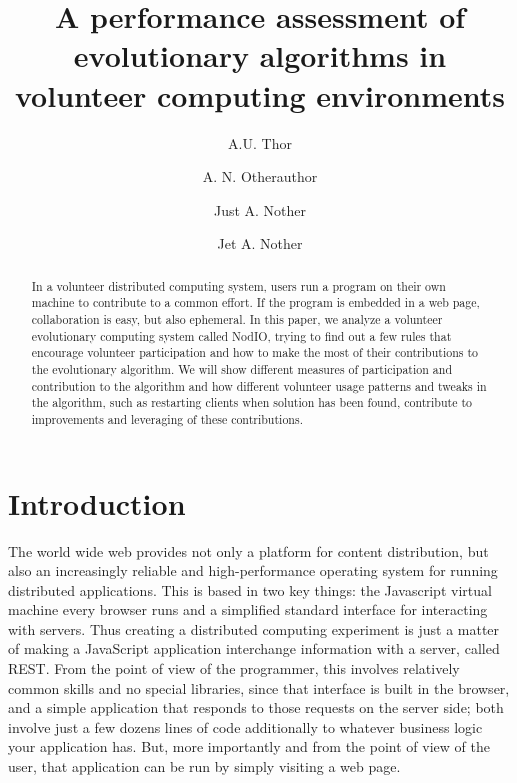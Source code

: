 \documentclass[runningheads,a4paper]{llncs}\usepackage[]{graphicx}\usepackage[]{color}
\begin{document}



\title{A performance assessment of evolutionary algorithms in
  volunteer computing environments} 



\author{A.U. Thor \and A. N. Otherauthor \and Just A. Nother 
  \and Jet A. Nother }


\maketitle


\begin{abstract}
In a volunteer distributed computing system, users run a program on
their own machine to contribute to a common effort. If the program is
embedded in a web page, collaboration is easy, but also ephemeral. In
this paper, we analyze a volunteer evolutionary computing system called
NodIO, trying to find out a few rules that encourage volunteer
participation and how to make the most of their contributions to the
evolutionary algorithm. We will show different measures of
participation and contribution to the algorithm and how different
volunteer usage patterns and tweaks in the algorithm, such as restarting clients when solution has been found, contribute to
improvements and leveraging of these contributions. 
\end{abstract}

\section{Introduction}
\label{introduction}


The world wide web provides not only a platform for content
distribution, but also an increasingly reliable and high-performance
operating system for running distributed applications. This is based
in two key things: the Javascript virtual machine every browser runs
and a simplified standard interface for interacting with servers.
Thus creating a distributed computing experiment is just a matter of
making a JavaScript application interchange information with a server,
called REST. From the point of view of the programmer, this involves
relatively common skills and no special libraries, since that
interface is built in the browser, and a simple application that
responds to those requests on the server side; both involve just a few
dozens lines of code additionally to whatever business logic your
application has. But, more importantly and from the point of view of
the user, that application can be run by simply visiting a web page.
\end{document}
